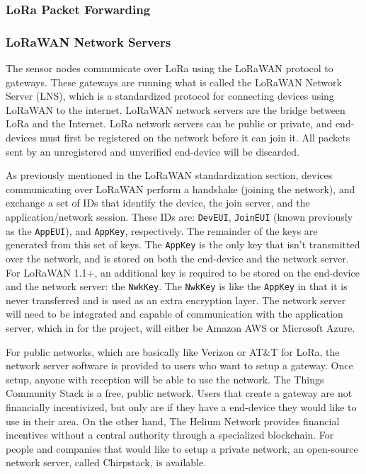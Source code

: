 \subsubsection{LoRa Packet Forwarding}

\subsubsection{LoRaWAN Network Servers} The sensor nodes communicate over LoRa
using the LoRaWAN protocol to gateways.  These gateways are running what is
called the LoRaWAN Network Server (LNS), which is a standardized protocol for
connecting devices using LoRaWAN to the internet.  LoRaWAN network servers are
the bridge between LoRa and the Internet.  LoRa network servers can be public or
private, and end-devices must first be registered on the network before it can
join it. All packets sent by an unregistered and unverified end-device will be
discarded.

As previously mentioned in the LoRaWAN standardization section,
devices communicating over LoRaWAN perform a handshake (joining the network),
and exchange a set of IDs that identify the device, the join server, and the
application/network session. These IDs are: \texttt{DevEUI}, \texttt{JoinEUI} (known previously as
the \texttt{AppEUI}), and \texttt{AppKey}, respectively. The remainder of the keys are generated
from this set of keys. The \texttt{AppKey} is the only key that isn't transmitted over
the network, and is stored on both the end-device and the network server. For
LoRaWAN 1.1+, an additional key is required to be stored on the end-device and
the network server: the \texttt{NwkKey}. The \texttt{NwkKey} is like the \texttt{AppKey} in that it is
never transferred and is used as an extra encryption layer. The network server
will need to be integrated and capable of communication with the application
server, which in for the project, will either be Amazon AWS or Microsoft Azure.

For public networks, which are basically like Verizon or AT\&T for LoRa, the
network server software is provided to users who want to setup a gateway. Once
setup, anyone with reception will be able to use the network. The Things Community Stack
is a free, public network. Users that create a gateway are not financially
incentivized, but only are if they have a end-device they would like to use in
their area. On the other hand, The Helium Network provides financial incentives
without a central authority through a specialized blockchain. For people and
companies that would like to setup a private network, an open-source network
server, called Chirpstack, is available.


